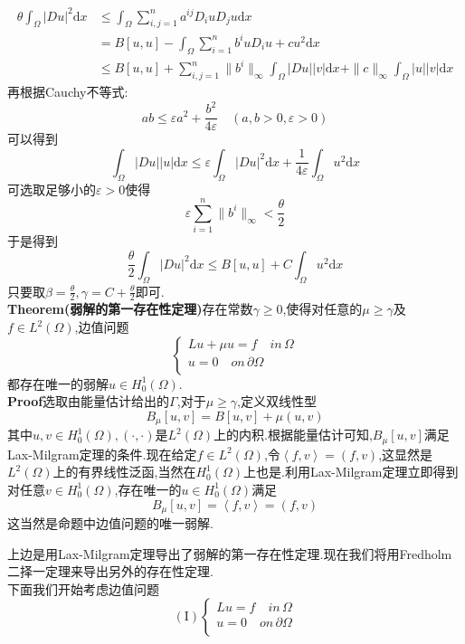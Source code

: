 \documentclass[a4paper,UTF8,12pt]{ctexart}
\begin{document}
$$
\begin{aligned}
    \theta\int_{\Omega}|Du|^2\mathrm{d}x &\leqslant\int_{\Omega}\sum^n_{i,j=1}a^{ij}D_iu D_ju\mathrm{d}x\\
                                         &=B[u,u]-\int_{\Omega}\sum^n_{i=1}b^iuD_iu+cu^2\mathrm{d}x\\
                                         &\leqslant B[u,u]+\sum^n_{i,j=1}\|b^{i}\|_{\infty}\int_{\Omega}|Du||v|\mathrm{d}x+\|c\|_{\infty}\int_{\Omega}|u||v|\mathrm{d}x
\end{aligned}
$$
再根据Cauchy不等式:
$$
ab\leqslant\varepsilon a^2+\frac{b^2}{4\varepsilon}\quad (a,b>0,\varepsilon>0)
$$
可以得到
$$
\int_{\Omega}|Du||u|\mathrm{d}x\leqslant \varepsilon\int_{\Omega}|Du|^2\mathrm{d}x+\frac{1}{4\varepsilon}\int_{\Omega}u^2\mathrm{d}x
$$
可选取足够小的$\varepsilon>0$使得
$$
\varepsilon\sum^n_{i=1}\|b^i\|_{\infty}<\frac{\theta}{2}
$$
于是得到
$$
\frac{\theta}{2}\int_{\Omega}|Du|^2\mathrm{d}x\leqslant B[u,u]+C\int_{\Omega}u^2\mathrm{d}x
$$
只要取$\beta=\frac{\theta}{2},\gamma=C+\frac{\theta}{2}$即可.\\
\textbf{Theorem(弱解的第一存在性定理)}\quad 存在常数$\gamma\geqslant 0$,使得对任意的$\mu\geqslant\gamma$及$f\in L^2(\Omega)$,边值问题
$$
\begin{cases}
    Lu+\mu u=f\quad in\, \Omega\\
    u=0\quad on\,\partial \Omega\\
\end{cases}
$$
都存在唯一的弱解$u\in H^1_0(\Omega)$.\\
\textbf{Proof}\quad 选取由能量估计给出的$\Gamma$,对于$\mu\geqslant \gamma$,定义双线性型
$$
B_{\mu}[u,v]=B[u,v]+\mu (u,v)
$$
其中$u,v\in H^1_0(\Omega),(\cdot,\cdot)$是$L^2(\Omega)$上的内积.根据能量估计可知,$B_{\mu}[u,v]$满足Lax-Milgram定理的条件.现在给定$f\in L^2(\Omega)$,令$\left\langle f,v \right\rangle =(f,v)$,这显然是$L^2(\Omega)$上的有界线性泛函,当然在$H^1_0(\Omega)$上也是.利用Lax-Milgram定理立即得到对任意$v\in H^1_0(\Omega)$,存在唯一的$u\in H^1_0(\Omega)$满足
$$
B_{\mu}[u,v]=\left\langle f,v \right\rangle =(f,v)
$$
这当然是命题中边值问题的唯一弱解.\par
上边是用Lax-Milgram定理导出了弱解的第一存在性定理.现在我们将用Fredholm二择一定理来导出另外的存在性定理.\\
下面我们开始考虑边值问题
$$(\text{I})
\begin{cases}
    Lu= f\quad in \, \Omega\\
     u= 0\quad on \, \partial\Omega\\ 
\end{cases}
$$
\end{document}
